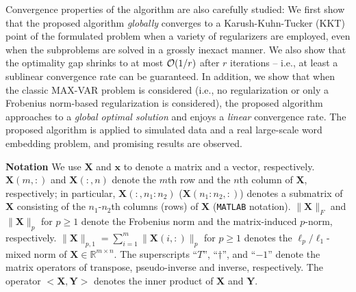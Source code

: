 \documentclass[10pt,journal]{IEEEtran}
\newcommand{\X}{\boldsymbol{X}}
\begin{document}
Convergence properties of the algorithm are also carefully studied:
We first show that the proposed algorithm \emph{globally} converges to a Karush-Kuhn-Tucker (KKT) point of the formulated problem when a variety of regularizers are employed, even when the subproblems are solved in a grossly inexact manner.
We also show that the optimality gap shrinks to at most ${\cal O}(1/r)$ after $r$ iterations -- i.e.,
at least a sublinear convergence rate can be guaranteed.
In addition, we show that when the classic MAX-VAR problem is considered (i.e., no regularization or only a Frobenius norm-based regularization is considered), the proposed algorithm approaches to a  \textit{global optimal solution} and enjoys a \textit{linear} convergence rate.
The proposed algorithm is applied to simulated data and a real large-scale word embedding problem, and promising results are observed.

\bigskip

\noindent
{\bf Notation} We use $\X$ and ${\bm x}$ to denote a matrix and a vector, respectively.
$\X(m,:)$ and $\X(:,n)$ denote the $m$th row and the $n$th column of $\X$, respectively;
in particular, $\X(:,n_1:n_2)$ ($\X(n_1:n_2,:)$) denotes a submatrix of $\X$ consisting of the $n_1$-$n_2$th columns (rows) of $\X$ (\texttt{MATLAB} notation).
$\|\X\|_F$ and $\|\X\|_p$ for $p\geq 1$ denote the Frobenius norm and the matrix-induced $p$-norm, respectively. $\|\X\|_{p,1} = \sum_{i=1}^m \|\X(i,:)\|_p$ for $p\geq 1$ denotes the $\ell_p/\ell_1$-mixed norm of $\X\in\mathbb{R}^{m\times n}$.
The superscripts ``$T$'', ``$\dag$'', and ``${-1}$'' denote the matrix operators of transpose, pseudo-inverse and inverse, respectively. 
The operator $<{\bm X},{\bm Y}>$ denotes the inner product of ${\bm X}$ and ${\bm Y}$.
\end{document}
